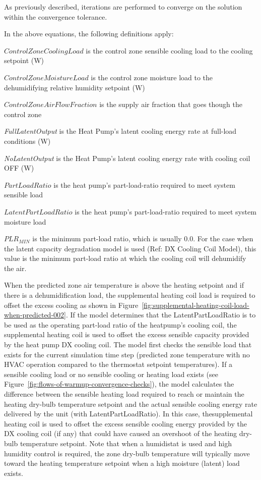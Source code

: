 As previously described, iterations are performed to converge on the solution within the convergence tolerance.

In the above equations, the following definitions apply:

\(ControlZoneCoolingLoad\) is the control zone sensible cooling load to the cooling setpoint (W)

\(ControlZoneMoistureLoad\) is the control zone moisture load to the dehumidifying relative humidity setpoint (W)

\(ControlZoneAirFlowFraction\) is the supply air fraction that goes though the control zone

\emph{FullLatentOutput} is the Heat Pump's latent cooling energy rate at full-load conditions (W)

\emph{NoLatentOutput} is the Heat Pump's latent cooling energy rate with cooling coil OFF (W)

\(PartLoadRatio\) is the heat pump's part-load-ratio required to meet system sensible load

\(LatentPartLoadRatio\) is the heat pump's part-load-ratio required to meet system moisture load

\(PL{R_{MIN}}\) is the minimum part-load ratio, which is usually 0.0. For the case when the latent capacity degradation model is used (Ref: DX Cooling Coil Model), this value is the minimum part-load ratio at which the cooling coil will dehumidify the air.

When the predicted zone air temperature is above the heating setpoint and if there is a dehumidification load, the supplemental heating coil load is required to offset the excess cooling as shown in Figure~\ref{fig:supplemental-heating-coil-load-when-predicted-002}. If the model determines that the LatentPartLoadRatio is to be used as the operating part-load ratio of the heatpump's cooling coil, the supplemental heating coil is used to offset the excess sensible capacity provided by the heat pump DX cooling coil. The model first checks the sensible load that exists for the current simulation time step (predicted zone temperature with no HVAC operation compared to the thermostat setpoint temperatures). If a sensible cooling load or no sensible cooling or heating load exists (see Figure~\ref{fig:flows-of-warmup-convergence-checks}), the model calculates the difference between the sensible heating load required to reach or maintain the heating dry-bulb temperature setpoint and the actual sensible cooling energy rate delivered by the unit (with LatentPartLoadRatio). In this case, thesupplemental heating coil is used to offset the excess sensible cooling energy provided by the DX cooling coil (if any) that could have caused an overshoot of the heating dry-bulb temperature setpoint. Note that when a humidistat is used and high humidity control is required, the zone dry-bulb temperature will typically move toward the heating temperature setpoint when a high moisture (latent) load exists.

